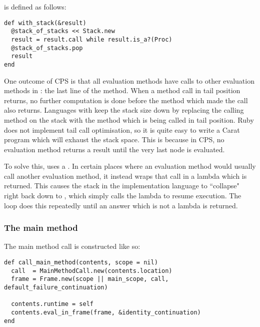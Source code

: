  is defined as follows:

\begin{minipage}{\textwidth}
\begin{lstlisting}
def with_stack(&result)
  @stack_of_stacks << Stack.new
  result = result.call while result.is_a?(Proc)
  @stack_of_stacks.pop
  result
end
\end{lstlisting}
\end{minipage}

One outcome of CPS is that all evaluation methods have calls to other evaluation methods in : the last line of the method. When a method call in tail position returns, no further computation is done before the method which made the call also returns. Languages with  keep the stack size down by replacing the calling method on the stack with the method which is being called in tail position. Ruby does not implement tail call optimisation, so it is quite easy to write a Carat program which will exhaust the stack space. This is because in CPS, no evaluation method returns a result until the very last node is evaluated.

To solve this,  uses a . In certain places where an evaluation method would usually call another evaluation method, it instead wraps that call in a lambda which is returned. This causes the stack in the implementation language to ``collapse" right back down to , which simply calls the lambda to resume execution. The  loop does this repeatedly until an answer which is not a lambda is returned.

\subsubsection{The main method}

The main method call is constructed like so:

\begin{minipage}{\textwidth}
\begin{lstlisting}
def call_main_method(contents, scope = nil)
  call  = MainMethodCall.new(contents.location)
  frame = Frame.new(scope || main_scope, call, default_failure_continuation)
  
  contents.runtime = self
  contents.eval_in_frame(frame, &identity_continuation)
end
\end{lstlisting}
\end{minipage}

